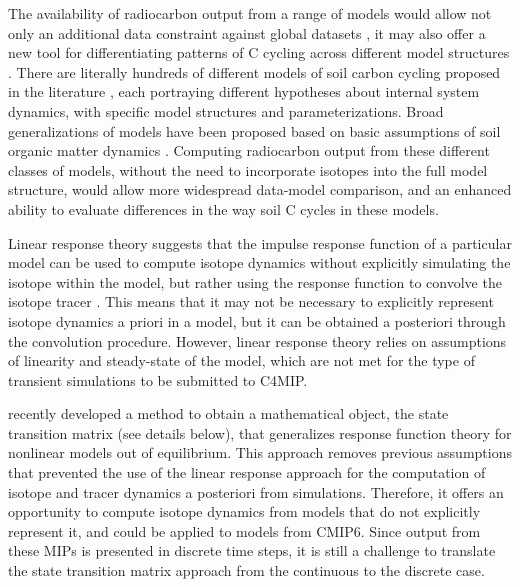 \documentclass[11pt,a4paper]{article}
\begin{document}
The availability of radiocarbon output from a range of models would allow not only an additional data constraint against global datasets \citep{He2016, Mathieu2015}, it may also offer a new tool for differentiating patterns of C cycling across different model structures \citep{Sierra2014}. 
There are literally hundreds of different models of soil carbon cycling proposed in the literature \citep{Manzoni2009SBB}, each portraying different hypotheses about internal system dynamics, with specific model structures and parameterizations. Broad generalizations of models have been proposed based on basic assumptions of soil organic matter dynamics \citep{Sierra2015}.
Computing radiocarbon output from these different classes of models, without the need to incorporate isotopes into the full model structure, would allow more widespread data-model comparison, and an enhanced ability to evaluate differences in the way soil C cycles in these models.

Linear response theory suggests that the impulse response function of a particular model can be used to compute isotope dynamics without explicitly simulating the isotope within the model, but rather using the response function to convolve the isotope tracer \citep{Thompson1999}. This means that it may not be necessary to explicitly represent isotope dynamics a priori in a model, but it can be obtained a posteriori through the convolution procedure. However, linear response theory relies on assumptions of linearity and steady-state of the model, which are not met for the type of transient simulations to be submitted to C4MIP. 

\citet{Metzler2018PNAS} recently developed a method to obtain a mathematical object, the state transition matrix (see details below), that generalizes response function theory for nonlinear models out of equilibrium. This approach removes previous assumptions that prevented the use of the linear response approach for the computation of isotope and tracer dynamics a posteriori from simulations. Therefore, it offers an opportunity to compute isotope dynamics from models that do not explicitly represent it, and could be applied to models from CMIP6. Since output from these MIPs is presented in discrete time steps, it is still a challenge to translate the state transition matrix approach from the continuous to the discrete case.
\end{document}
